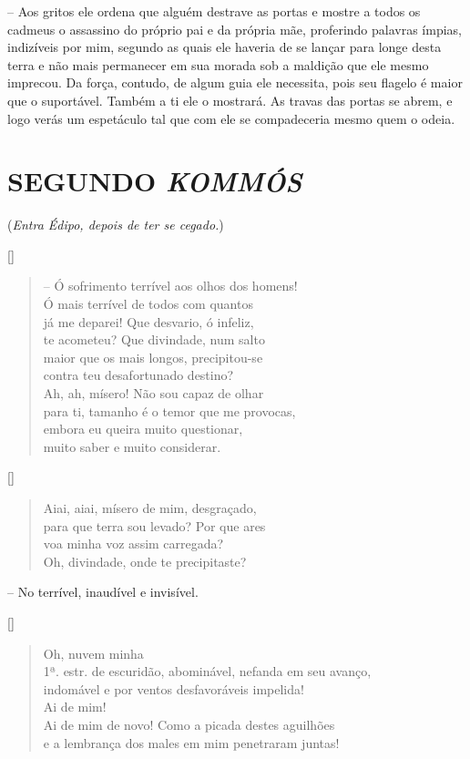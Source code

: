  --   Aos gritos ele ordena que alguém destrave as portas e mostre a todos os
cadmeus o assassino do próprio pai e da própria mãe, proferindo palavras
ímpias, indizíveis por  mim, segundo as quais ele haveria de se
lançar para longe desta terra e não mais permanecer em sua morada sob a
maldição que ele mesmo imprecou. Da força, contudo, de algum guia ele
necessita, pois seu flagelo é maior que o suportável. Também a ti ele o
mostrará. As travas das portas se abrem, e logo verás um espetáculo tal
que com ele se compadeceria mesmo quem o odeia.


\section{SEGUNDO \emph{KOMMÓS}}

(\emph{Entra Édipo, depois de ter se cegado.})


\hfill [] 

\begin{verse} -- Ó sofrimento terrível aos olhos dos homens!\\
Ó mais terrível de todos com quantos\\
já me deparei! Que desvario, ó infeliz,\\
te acometeu? Que divindade, num salto\\ 
maior que os mais longos, precipitou-se\\
contra teu desafortunado destino?\\
Ah, ah, mísero! Não sou capaz de olhar\\
para ti, tamanho é o temor que me provocas,\\
embora eu queira muito questionar,\\
muito saber e muito considerar.
\end{verse}

\hfill [] 

\begin{verse}Aiai, aiai, mísero de mim, desgraçado,\\
para que terra sou levado? Por que ares\\ 
voa minha voz assim carregada?\\
Oh, divindade, onde te precipitaste?
\end{verse}

 --   No terrível, inaudível e invisível.

\hfill [] 

\begin{verse}Oh, nuvem minha\\ 1ª. estr.
de escuridão, abominável, nefanda em seu avanço,\\
indomável e por ventos desfavoráveis impelida!\\
Ai de mim!\\
Ai de mim de novo! Como a picada destes aguilhões\\
e a lembrança dos males em mim penetraram juntas!
\end{verse}


